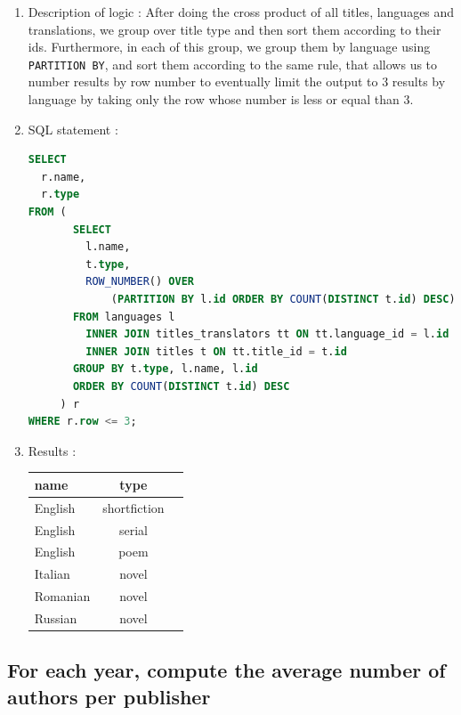 \documentclass[doubleside, titlepage]{article}
\begin{document}
	\begin{enumerate}
	\item Description of logic : After doing the cross product of all titles, languages and translations, we group over title type and then sort them according to their ids. Furthermore, in each of this group, we group them by language using \texttt{PARTITION BY}, and sort them according to the same rule, that allows us to number results by row number to eventually limit the output to 3 results by language by taking only the row whose number is less or equal than 3.
	\item SQL statement :
		\begin{lstlisting}[language=SQL,showspaces=false,basicstyle=\ttfamily,numberstyle=\tiny,commentstyle=\color{gray}]
SELECT
  r.name,
  r.type
FROM (
       SELECT
         l.name,
         t.type,
         ROW_NUMBER() OVER
             (PARTITION BY l.id ORDER BY COUNT(DISTINCT t.id) DESC) as row
       FROM languages l
         INNER JOIN titles_translators tt ON tt.language_id = l.id
         INNER JOIN titles t ON tt.title_id = t.id
       GROUP BY t.type, l.name, l.id
       ORDER BY COUNT(DISTINCT t.id) DESC
     ) r
WHERE r.row <= 3;
		\end{lstlisting}

	\item Results :\\

	\begin{tabular}{|l|c|r|}
	  \hline
		name & type\\
	  \hline
		English	& shortfiction \\
		English	& serial \\
		English	& poem \\
		Italian	& novel \\
		Romanian & novel \\
		Russian	& novel \\
	  \hline
	\end{tabular}
\end{enumerate}

\subsection{For each year, compute the average number of authors per publisher}
\end{document}

